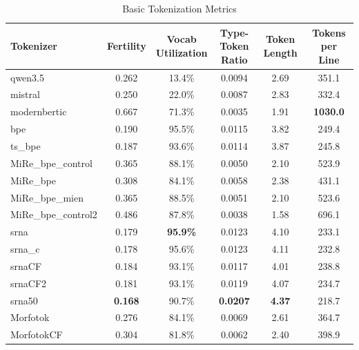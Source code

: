 \begin{table}[htbp]
\centering
\caption{Basic Tokenization Metrics}
\label{tab:basic_metrics}
\begin{tabular}{lccccc}
\toprule
Tokenizer & Fertility & \makecell{Vocab \\ Utilization} & \makecell{Type-Token \\ Ratio} & Token Length & Tokens per Line \\
\midrule
qwen3.5 & 0.262 & 13.4\% & 0.0094 & 2.69 & 351.1 \\
mistral & 0.250 & 22.0\% & 0.0087 & 2.83 & 332.4 \\
modernbertic & 0.667 & 71.3\% & 0.0035 & 1.91 & \textbf{1030.0} \\
bpe & 0.190 & 95.5\% & 0.0115 & 3.82 & 249.4 \\
ts\_bpe & 0.187 & 93.6\% & 0.0114 & 3.87 & 245.8 \\
MiRe\_bpe\_control & 0.365 & 88.1\% & 0.0050 & 2.10 & 523.9 \\
MiRe\_bpe & 0.308 & 84.1\% & 0.0058 & 2.38 & 431.1 \\
MiRe\_bpe\_mien & 0.365 & 88.5\% & 0.0051 & 2.10 & 523.6 \\
MiRe\_bpe\_control2 & 0.486 & 87.8\% & 0.0038 & 1.58 & 696.1 \\
srna & 0.179 & \textbf{95.9\%} & 0.0123 & 4.10 & 233.1 \\
srna\_c & 0.178 & 95.6\% & 0.0123 & 4.11 & 232.8 \\
srnaCF & 0.184 & 93.1\% & 0.0117 & 4.01 & 238.8 \\
srnaCF2 & 0.181 & 93.1\% & 0.0119 & 4.07 & 234.7 \\
srna50 & \textbf{0.168} & 90.7\% & \textbf{0.0207} & \textbf{4.37} & 218.7 \\
Morfotok & 0.276 & 84.1\% & 0.0069 & 2.61 & 364.7 \\
MorfotokCF & 0.304 & 81.8\% & 0.0062 & 2.40 & 398.9 \\
\bottomrule
\end{tabular}
\end{table}